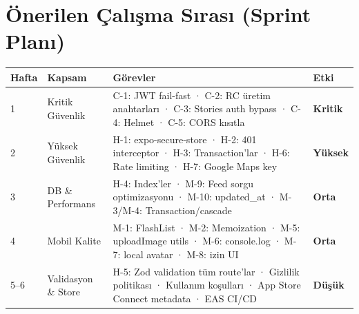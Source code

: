 \documentclass[12pt,a4paper]{article}
\begin{document}
\section{Önerilen Çalışma Sırası (Sprint Planı)}

\begin{longtable}{p{}p{}p{}p{}}
\toprule
\textbf{Hafta} & \textbf{Kapsam} & \textbf{Görevler} & \textbf{Etki} \\
\midrule
\endhead

\rowcolor{critical!10}
1 &
Kritik \linebreak Güvenlik &
C-1: JWT fail-fast · C-2: RC üretim anahtarları · C-3: Stories auth bypass · C-4: Helmet · C-5: CORS kısıtla &
\textcolor{critical}{\textbf{Kritik}} \\

\rowcolor{high!10}
2 &
Yüksek \linebreak Güvenlik &
H-1: expo-secure-store · H-2: 401 interceptor · H-3: Transaction'lar · H-6: Rate limiting · H-7: Google Maps key &
\textcolor{high}{\textbf{Yüksek}} \\

\rowcolor{medium!10}
3 &
DB \& \linebreak Performans &
H-4: Index'ler · M-9: Feed sorgu optimizasyonu · M-10: updated\_at · M-3/M-4: Transaction/cascade &
\textcolor{medium}{\textbf{Orta}} \\

\rowcolor{medium!10}
4 &
Mobil \linebreak Kalite &
M-1: FlashList · M-2: Memoization · M-5: uploadImage utils · M-6: console.log · M-7: local avatar · M-8: izin UI &
\textcolor{medium}{\textbf{Orta}} \\

\rowcolor{low!10}
5--6 &
Validasyon \linebreak \& Store &
H-5: Zod validation tüm route'lar · Gizlilik politikası · Kullanım koşulları · App Store Connect metadata · EAS CI/CD &
\textcolor{low}{\textbf{Düşük}} \\

\bottomrule
\end{longtable}

\end{document}
